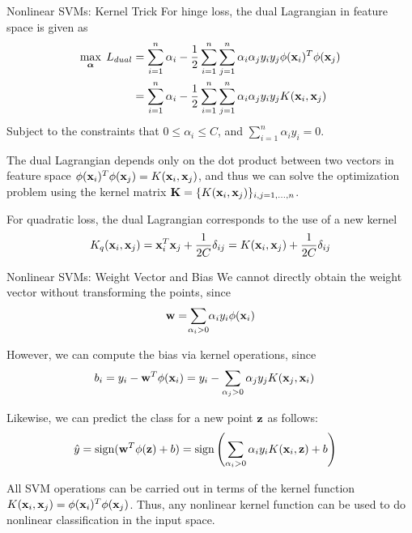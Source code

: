 \begin{frame}{Nonlinear SVMs: Kernel Trick}
For hinge loss, the dual Lagrangian in feature space is given as
\begin{align*}
    \max_{{\bm \alpha}} \; L_{dual} & = \displaystyle \sum_{i=1}^n\alpha_{i} - {1 \over 2} \displaystyle \sum_{i=1}^n
  \displaystyle \sum_{j=1}^n \alpha_i\alpha_{j} y_i y_{j} \phi(\mathbf{x}_i)^T
  \phi(\mathbf{x}_{j})\\
  & =  \displaystyle \sum_{i=1}^n\alpha_{i} - {1 \over 2} \displaystyle \sum_{i=1}^n
  \displaystyle \sum_{j=1}^n \alpha_i\alpha_{j} y_i y_{j} K(\mathbf{x}_i,\mathbf{x}_{j})
\end{align*}
Subject to the constraints that $0 \le \alpha_i \le C$, and
$\sum_{i=1}^n \alpha_i y_i = 0$.

\medskip
The dual Lagrangian depends only on the
dot product between two vectors in feature space
$\phi(\mathbf{x}_i)^T \phi(\mathbf{x}_{j})= K(\mathbf{x}_i,\mathbf{x}_{j})$, and thus we can
solve the optimization problem using the kernel matrix $\mathbf{K} =
\{K(\mathbf{x}_i, \mathbf{x}_{j}) \}_{i,j=1,\ldots,n}$.


\medskip 
For quadratic loss,
the dual Lagrangian
corresponds to the use of a new kernel
\begin{align*}
    K_q(\mathbf{x}_i, \mathbf{x}_{j}) = \mathbf{x}_i^T\mathbf{x}_{j} + {1\over 2C}\delta_{ij}
    = K(\mathbf{x}_i, \mathbf{x}_{j}) + {1\over 2C}\delta_{ij}
\end{align*}
\end{frame}



\begin{frame}{Nonlinear SVMs: Weight Vector and Bias}
We cannot directly obtain the weight vector without transforming the
points, since
\begin{align*}
    \bw  =  \dsum_{\mathclap{\alpha_i>0}} \alpha_i y_i \phi(\bx_i)
\end{align*}


However, we can compute the bias via kernel operations, since
\begin{align*}
    b_i  & =  y_i - \mathbf{w}^T\phi(\mathbf{x}_i) = 
     y_i - \displaystyle \sum_{\alpha_{j} >0} \alpha_{j} y_{j}
    K(\mathbf{x}_{j},\mathbf{x}_i)
\end{align*}

Likewise, we can 
predict the class for a new point $\mathbf{z}$ as follows:
\begin{align*}
  \hat{y}  & =  \operatorname{sign}(\mathbf{w}^T\phi(\mathbf{z}) + b)
         =  \operatorname{sign}\left(\sum_{\alpha_i> 0}
        \alpha_i y_i K(\mathbf{x}_i,\mathbf{z}) + b\right)
\end{align*}

All SVM operations can be carried out in
terms of the kernel function $K(\mathbf{x}_i, \mathbf{x}_{j}) =
\phi(\mathbf{x}_i)^T\phi(\mathbf{x}_{j})$. 
Thus, any nonlinear kernel function can be used to
do nonlinear classif\/{i}cation in the input space.

\end{frame}




